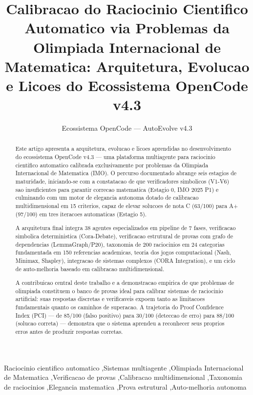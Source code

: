 \documentclass[5p]{elsarticle}
\begin{document}
\begin{frontmatter}
\title{Calibracao do Raciocinio Cientifico Automatico via Problemas da Olimpiada Internacional de Matematica: Arquitetura, Evolucao e Licoes do Ecossistema OpenCode v4.3}
\author[ufc]{Ecossistema OpenCode --- AutoEvolve v4.3}
\address[ufc]{PPGTE/CT/UFC --- Universidade Federal do Ceara, Fortaleza, CE, Brasil}

\begin{abstract}
\noindent Este artigo apresenta a arquitetura, evolucao e licoes aprendidas no
desenvolvimento do ecossistema OpenCode v4.3 --- uma plataforma multiagente para
raciocinio cientifico automatico calibrada exclusivamente por problemas da
Olimpiada Internacional de Matematica (IMO). O percurso documentado abrange seis
estagios de maturidade, iniciando-se com a constatacao de que verificadores
simbolicos (V1-V6) sao insuficientes para garantir correcao matematica (Estagio
0, IMO 2025 P1) e culminando com um motor de elegancia autonoma dotado de
calibracao multidimensional em 15 criterios, capaz de elevar solucoes de nota
C (63/100) para A+ (97/100) em tres iteracoes automaticas (Estagio 5).

A arquitetura final integra 38 agentes especializados em pipeline de 7 fases,
verificacao simbolica deterministica (Cora-Debate), verificacao estrutural de
provas com grafo de dependencias (LemmaGraph/P20), taxonomia de 200 raciocinios
em 24 categorias fundamentada em 150 referencias academicas, teoria dos jogos
computacional (Nash, Minimax, Shapley), integracao de sistemas complexos (CORA
Integration), e um ciclo de auto-melhoria baseado em calibracao multidimensional.

A contribuicao central deste trabalho e a demonstracao empirica de que problemas
de olimpiada constituem o banco de provas ideal para calibrar sistemas de
raciocinio artificial: suas respostas discretas e verificaveis expoem tanto
as limitacoes fundamentais quanto os caminhos de superacao. A trajetoria do
Proof Confidence Index (PCI) --- de 85/100 (falso positivo) para 30/100
(deteccao de erro) para 88/100 (solucao correta) --- demonstra que o sistema
aprendeu a reconhecer seus proprios erros antes de produzir respostas corretas.

\end{abstract}
\begin{keyword}
Raciocinio cientifico automatico \sep Sistemas multiagente \sep Olimpiada Internacional de Matematica \sep Verificacao de provas \sep Calibracao multidimensional \sep Taxonomia de raciocinios \sep Elegancia matematica \sep Prova estrutural \sep Auto-melhoria autonoma
\end{keyword}
\end{frontmatter}
\maketitle
\end{document}
